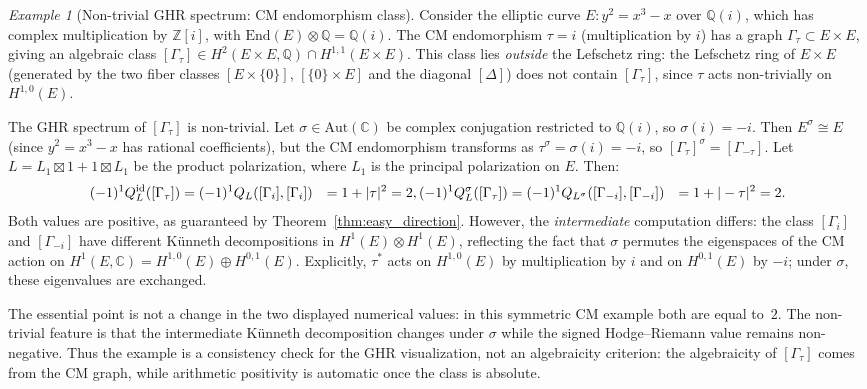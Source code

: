 \documentclass[aps,prd,twocolumn,superscriptaddress,nofootinbib]{revtex4-2}
\theoremstyle{definition}
\theoremstyle{remark}
\newtheorem{example}[theorem]{Example}
\def\\{ }%
\begin{document}
\begin{example}[Non-trivial GHR spectrum: CM endomorphism class]
\label{ex:cm_endomorphism}
Consider the elliptic curve $E: y^2 = x^3 - x$ over $\mathbb{Q}(i)$, which has complex multiplication by $\mathbb{Z}[i]$, with $\mathrm{End}(E) \otimes \mathbb{Q} = \mathbb{Q}(i)$. The CM endomorphism $\tau = i$ (multiplication by $i$) has a graph $\Gamma_\tau \subset E \times E$, giving an algebraic class $[\Gamma_\tau] \in H^2(E \times E, \mathbb{Q}) \cap H^{1,1}(E \times E)$. This class lies \emph{outside} the Lefschetz ring: the Lefschetz ring of $E \times E$ (generated by the two fiber classes $[E \times \{0\}]$, $[\{0\} \times E]$ and the diagonal $[\Delta]$) does not contain $[\Gamma_\tau]$, since $\tau$ acts non-trivially on $H^{1,0}(E)$.

The GHR spectrum of $[\Gamma_\tau]$ is non-trivial. Let $\sigma \in \mathrm{Aut}(\mathbb{C})$ be complex conjugation restricted to $\mathbb{Q}(i)$, so $\sigma(i) = -i$. Then $E^\sigma \cong E$ (since $y^2 = x^3 - x$ has rational coefficients), but the CM endomorphism transforms as $\tau^\sigma = \sigma(i) = -i$, so $[\Gamma_\tau]^\sigma = [\Gamma_{-\tau}]$. Let $L = L_1 \boxtimes 1 + 1 \boxtimes L_1$ be the product polarization, where $L_1$ is the principal polarization on $E$. Then:
\begin{align}
(-1)^1 Q_L^\mathrm{id}([\Gamma_\tau])
&= (-1)^1 Q_L([\Gamma_i], [\Gamma_i]) \notag\\
&= 1 + |\tau|^2 = 2, \label{eq:cm_id}\\
(-1)^1 Q_L^\sigma([\Gamma_\tau])
&= (-1)^1 Q_{L^\sigma}([\Gamma_{-i}], [\Gamma_{-i}]) \notag\\
&= 1 + |-\tau|^2 = 2. \label{eq:cm_sigma}
\end{align}
Both values are positive, as guaranteed by Theorem~\ref{thm:easy_direction}. However, the \emph{intermediate} computation differs: the class $[\Gamma_i]$ and $[\Gamma_{-i}]$ have different Künneth decompositions in $H^1(E) \otimes H^1(E)$, reflecting the fact that $\sigma$ permutes the eigenspaces of the CM action on $H^1(E, \mathbb{C}) = H^{1,0}(E) \oplus H^{0,1}(E)$. Explicitly, $\tau^*$ acts on $H^{1,0}(E)$ by multiplication by $i$ and on $H^{0,1}(E)$ by $-i$; under $\sigma$, these eigenvalues are exchanged.

The essential point is not a change in the two displayed numerical values: in this symmetric CM example both are equal to~$2$. The non-trivial feature is that the intermediate Künneth decomposition changes under $\sigma$ while the signed Hodge--Riemann value remains non-negative. Thus the example is a consistency check for the GHR visualization, not an algebraicity criterion: the algebraicity of $[\Gamma_\tau]$ comes from the CM graph, while arithmetic positivity is automatic once the class is absolute.
\end{example}
\end{document}
